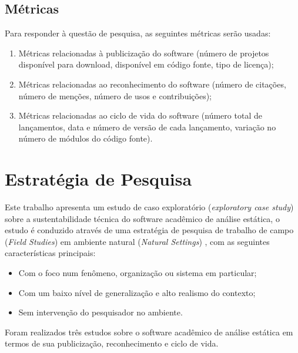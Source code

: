 \subsection{Métricas}

Para responder à questão de pesquisa, as seguintes métricas serão usadas:

\begin{enumerate}
  \item Métricas relacionadas à publicização do software (número de projetos
  disponível para download, disponível em código fonte, tipo de licença);

  \item Métricas relacionadas ao reconhecimento do software (número de
  citações, número de menções, número de usos e contribuições);

  \item Métricas relacionadas ao ciclo de vida do software (número total de
  lançamentos, data e número de versão de cada lançamento, variação no número
  de módulos do código fonte).
\end{enumerate}

\section{Estratégia de Pesquisa}

Este trabalho apresenta um estudo de caso exploratório ({\it exploratory case
study}) sobre a sustentabilidade técnica do software acadêmico de análise
estática, o estudo é conduzido através de uma estratégia de pesquisa de
trabalho de campo ({\it Field Studies}) em ambiente natural ({\it Natural
Settings}) \cite{stol2015holistic}, com as seguintes características
principais:

\begin{itemize}
  \item Com o foco num fenômeno, organização ou sistema em particular;
  \item Com um baixo nível de generalização e alto realismo do contexto;
  \item Sem intervenção do pesquisador no ambiente.
\end{itemize}


Foram realizados três estudos sobre o software acadêmico de análise estática em
termos de sua publicização, reconhecimento e ciclo de vida.

